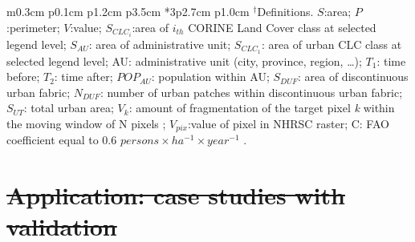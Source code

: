 \documentclass[APA,LATO1COL,doublespace]{WileyNJD-v2}
\providecommand{\DIFdeltex}[1]{{\protect\color{red}\sout{#1}}}                      %
\providecommand{\DIFdelbegin}{} %
\providecommand{\DIFaddbeginFL}{} %
\providecommand{\DIFaddendFL}{} %
\providecommand{\DIFdelbeginFL}{} %
\providecommand{\DIFdelendFL}{} %
\providecommand{\DIFdel}[1]{\texorpdfstring{\DIFdeltex{#1}}{}} %
\begin{document}
\begin{table}
\begin{tabular}{m{0.3cm} p{0.1cm} p{1.2cm} p{3.5cm} *{3}{p{2.7cm}} p{1.0cm} }
    {
      \DIFdelbeginFL %
\DIFdelendFL \DIFaddbeginFL \footnotesize{$^\dagger$Definitions. 
      $S$:area;
      $P$:perimeter;
      $V$:value;
      $S_{CLC_i}$:area of $i_{th}$ CORINE Land Cover class at selected legend level; 
      $S_{AU}$: area of administrative unit; 
      $S_{CLC_1}$: area of urban CLC class at selected legend level; 
      AU: administrative unit (city, province, region, \ldots); 
      $T_1$: time before; 
      $T_2$: time after; 
      $POP_{AU}$: population within AU; 
      $S_{DUF}$: area of discontinuous urban fabric; 
      $N_{DUF}$: number of urban patches within discontinuous urban fabric; 
      $S_{UT}$: total urban area; 
      $V_k$: amount of fragmentation of the target pixel \textit{k} within the moving window of N pixels }\DIFaddendFL ;
      $V_{pix}$:value of pixel in NHRSC raster;
      C: FAO coefficient equal to 0.6 $persons \times ha^{-1} \times year^{-1}$
      .
    }
    \end{tabular}
\end{table}
\DIFdelbegin \section{\DIFdel{Application: case studies with validation}}
\addtocounter{section}{-1}%
\end{document}
